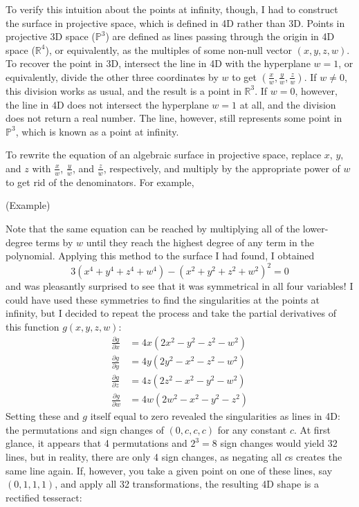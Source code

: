 \documentclass{article}
\begin{document}
To verify this intuition about the points at infinity, though,
I had to construct the surface in projective space,
which is defined in 4D rather than 3D.
Points in projective 3D space ($\mathbb{P}^3$)
are defined as lines passing through the origin in 4D space ($\mathbb{R}^4$),
or equivalently, as the multiples of some non-null vector $(x, y, z, w)$.
To recover the point in 3D, intersect the line in 4D with the hyperplane $w=1$,
or equivalently, divide the other three coordinates by $w$
to get $\left(\frac{x}{w}, \frac{y}{w}, \frac{z}{w}\right)$.
If $w\neq0$, this division works as usual, and the result is a point in $\mathbb{R}^3$.
If $w=0$, however, the line in 4D does not intersect the hyperplane $w=1$ at all,
and the division does not return a real number.
The line, however, still represents some point in $\mathbb{P}^3$,
which is known as a point at infinity.

To rewrite the equation of an algebraic surface in projective space,
replace $x$, $y$, and $z$ with $\frac{x}{w}$, $\frac{y}{w}$, and $\frac{z}{w}$, respectively,
and multiply by the appropriate power of $w$ to get rid of the denominators.
For example,

(Example)

Note that the same equation can be reached by multiplying all of the lower-degree terms by $w$
until they reach the highest degree of any term in the polynomial.
Applying this method to the surface I had found, I obtained
$$3(x^4+y^4+z^4+w^4)-(x^2+y^2+z^2+w^2)^2=0$$
and was pleasantly surprised to see that it was symmetrical in all four variables!
I could have used these symmetries to find the singularities at the points at infinity,
but I decided to repeat the process
and take the partial derivatives of this function $g(x, y, z, w)$:
\begin{align*}
  \frac{\partial g}{\partial x} &= 4x(2x^2-y^2-z^2-w^2) \\ 
  \frac{\partial g}{\partial y} &= 4y(2y^2-x^2-z^2-w^2) \\ 
  \frac{\partial g}{\partial z} &= 4z(2z^2-x^2-y^2-w^2) \\ 
  \frac{\partial g}{\partial w} &= 4w(2w^2-x^2-y^2-z^2) 
\end{align*}
Setting these and $g$ itself equal to zero revealed the singularities as lines in 4D:
the permutations and sign changes of $(0, c, c, c)$ for any constant $c$.
At first glance, it appears that 4 permutations and $2^3=8$ sign changes would yield 32 lines,
but in reality, there are only 4 sign changes, as negating all $c$s creates the same line again.
If, however, you take a given point on one of these lines, say $(0, 1, 1, 1)$,
and apply all 32 transformations, the resulting 4D shape is a rectified tesseract:
\end{document}
